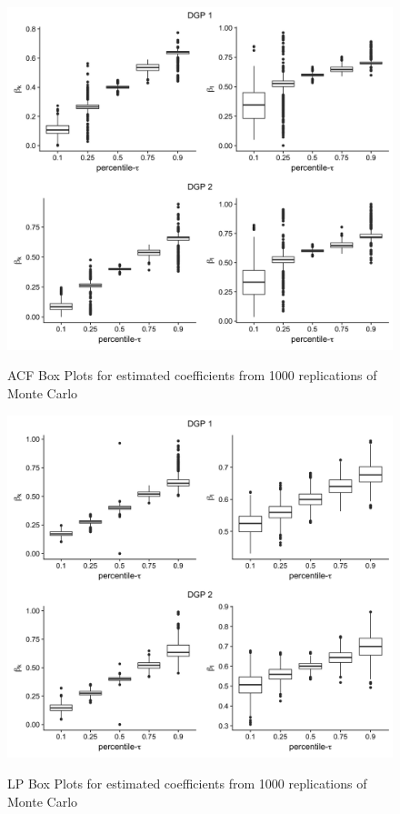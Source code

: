 \documentclass[11pt]{article}
\begin{document}
\begin{figure}[H]
\centering
\caption{ACF Box Plots for estimated coefficients from 1000 replications of Monte Carlo}
\includegraphics[width=12cm]{QACF_Box_Plot.png}
\label{ACF_Box Plot}
\end{figure}

\begin{figure}[H]
\centering
\caption{LP Box Plots for estimated coefficients from 1000 replications of Monte Carlo}
\includegraphics[width=12cm]{QLP_Box_Plot.png}
\label{LP_Box Plot}
\end{figure}
\end{document}
